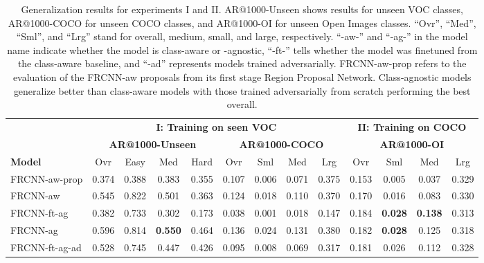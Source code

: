 \documentclass[10pt,twocolumn,letterpaper]{article}
\begin{document}
\begin{table*}
\centering
\caption{\label{tab:generalization}Generalization results for experiments I and II. AR@1000-Unseen shows results for unseen VOC classes, AR@1000-COCO for unseen COCO classes, and AR@1000-OI for unseen Open Images classes. ``Ovr'', ``Med'', ``Sml'', and ``Lrg'' stand for overall, medium, small, and large, respectively. ``-aw-'' and ``-ag-'' in the model name indicate whether the model is class-aware or -agnostic, ``-ft-'' tells whether the model was finetuned from the class-aware baseline, and ``-ad'' represents models trained adversarially. FRCNN-aw-prop refers to the evaluation of the FRCNN-aw proposals from its first stage Region Proposal Network. Class-agnostic models generalize better than class-aware models with those trained adversarially from scratch performing the best overall.}
\setlength{\tabcolsep}{0.55em} \begin{tabular}{l c c c c c c c c c c c c}
 \toprule
  & \multicolumn{8}{c}{\textbf{I: Training on seen VOC}} & \multicolumn{4}{c}{\textbf{II: Training on COCO}} \\
  \cmidrule(lr){2-9} \cmidrule(lr){10-13}
  & \multicolumn{4}{c}{\textbf{AR@1000-Unseen}} & \multicolumn{4}{c}{\textbf{AR@1000-COCO}} & \multicolumn{4}{c}{\textbf{AR@1000-OI}} \\
 \cmidrule(lr){2-5} \cmidrule(lr){6-9} \cmidrule(lr){10-13}
\textbf{Model} & Ovr & Easy & Med & Hard & Ovr & Sml & Med & Lrg & Ovr & Sml & Med & Lrg \\
\cmidrule(r){1-1} \cmidrule(lr){2-2} \cmidrule(lr){3-3} \cmidrule(lr){4-4} \cmidrule(lr){5-5} \cmidrule(lr){6-6} \cmidrule(lr){7-7} \cmidrule(lr){8-8}  \cmidrule(lr){9-9}  \cmidrule(lr){10-10} \cmidrule(lr){11-11} \cmidrule(lr){12-12} \cmidrule(lr){13-13}
 FRCNN-aw-prop & 0.374 & 0.388 & 0.383 & 0.355 & 0.107 & 0.006 & 0.071 & 0.375 & 0.153 & 0.005 & 0.037 & 0.329 \\
 FRCNN-aw & 0.545 & 0.822 & 0.501 & 0.363 & 0.124 & 0.018 & 0.110 & 0.370 & 0.170 & 0.016 & 0.083 & 0.330 \\
 FRCNN-ft-ag & 0.382 & 0.733 & 0.302 & 0.173 & 0.038 & 0.001 & 0.018 & 0.147 & 0.184 & \textbf{0.028} & \textbf{0.138} & 0.313 \\
 FRCNN-ag & 0.596 & 0.814 & \textbf{0.550} & 0.464 & 0.136 & 0.024 & 0.131 & 0.380 & 0.182 & \textbf{0.028} & 0.125 & 0.318 \\
 FRCNN-ft-ag-ad & 0.528 & 0.745 & 0.447 & 0.426 & 0.095 & 0.008 & 0.069 & 0.317 & 0.181 & 0.026 & 0.112 & 0.328 \\

\end{tabular}
\end{table*}
\end{document}

